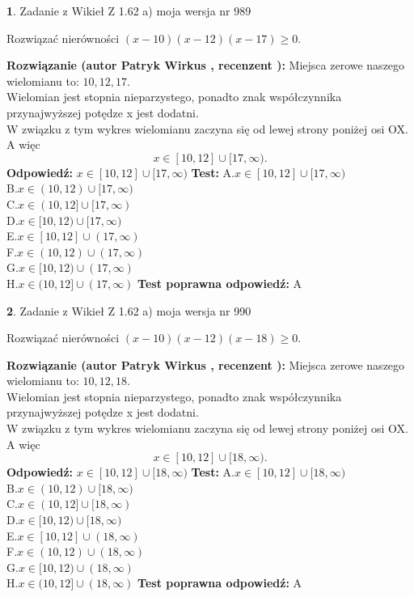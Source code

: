 \documentclass[12pt, a4paper]{article}
\theoremstyle{definition} %
\newtheorem{zad}{}
\newcommand{\zadStart}[1]{\begin{zad}#1\newline}
\newcommand{\zadStop}{\end{zad}}
\newcommand{\rozwStart}[2]{\noindent \textbf{Rozwiązanie (autor #1 , recenzent #2): }\newline}
\newcommand{\rozwStop}{\newline}
\newcommand{\odpStart}{\noindent \textbf{Odpowiedź:}\newline}
\newcommand{\odpStop}{\newline}
\newcommand{\testStart}{\noindent \textbf{Test:}\newline}
\newcommand{\testStop}{\newline}
\newcommand{\kluczStart}{\noindent \textbf{Test poprawna odpowiedź:}\newline}
\newcommand{\kluczStop}{\newline}
\begin{document}
\zadStart{Zadanie z Wikieł Z 1.62 a) moja wersja nr 989}

Rozwiązać nierówności $(x-10)(x-12)(x-17)\ge0$.
\zadStop
\rozwStart{Patryk Wirkus}{}
Miejsca zerowe naszego wielomianu to: $10, 12, 17$.\\
Wielomian jest stopnia nieparzystego, ponadto znak współczynnika przy\linebreak najwyższej potędze x jest dodatni.\\ W związku z tym wykres wielomianu zaczyna się od lewej strony poniżej osi OX. A więc $$x \in [10,12] \cup [17,\infty).$$
\rozwStop
\odpStart
$x \in [10,12] \cup [17,\infty)$
\odpStop
\testStart
A.$x \in [10,12] \cup [17,\infty)$\\
B.$x \in (10,12) \cup [17,\infty)$\\
C.$x \in (10,12] \cup [17,\infty)$\\
D.$x \in [10,12) \cup [17,\infty)$\\
E.$x \in [10,12] \cup (17,\infty)$\\
F.$x \in (10,12) \cup (17,\infty)$\\
G.$x \in [10,12) \cup (17,\infty)$\\
H.$x \in (10,12] \cup (17,\infty)$
\testStop
\kluczStart
A
\kluczStop



\zadStart{Zadanie z Wikieł Z 1.62 a) moja wersja nr 990}

Rozwiązać nierówności $(x-10)(x-12)(x-18)\ge0$.
\zadStop
\rozwStart{Patryk Wirkus}{}
Miejsca zerowe naszego wielomianu to: $10, 12, 18$.\\
Wielomian jest stopnia nieparzystego, ponadto znak współczynnika przy\linebreak najwyższej potędze x jest dodatni.\\ W związku z tym wykres wielomianu zaczyna się od lewej strony poniżej osi OX. A więc $$x \in [10,12] \cup [18,\infty).$$
\rozwStop
\odpStart
$x \in [10,12] \cup [18,\infty)$
\odpStop
\testStart
A.$x \in [10,12] \cup [18,\infty)$\\
B.$x \in (10,12) \cup [18,\infty)$\\
C.$x \in (10,12] \cup [18,\infty)$\\
D.$x \in [10,12) \cup [18,\infty)$\\
E.$x \in [10,12] \cup (18,\infty)$\\
F.$x \in (10,12) \cup (18,\infty)$\\
G.$x \in [10,12) \cup (18,\infty)$\\
H.$x \in (10,12] \cup (18,\infty)$
\testStop
\kluczStart
A
\kluczStop
\end{document}
